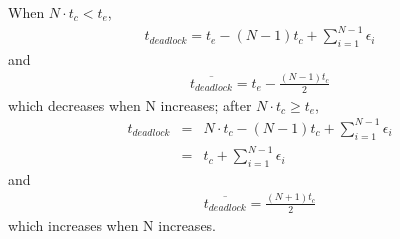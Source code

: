 \documentclass[12pt,letterpaper]{article}
\begin{document}
\begin{itemize}
When $N\cdot t_c<t_e$, 
\begin{align}
t_{deadlock} = t_e - (N-1)t_c + \sum^{N-1}_{i=1}\epsilon_i
\end{align}
and
\begin{align}
\overline{t_{deadlock}}=t_e - \frac{(N-1)t_c}{2}
\end{align}
which decreases when N increases; after $N\cdot t_c\ge t_e$, 
\begin{align}
\nonumber t_{deadlock} & = & N\cdot t_c - (N-1)t_c + \sum^{N-1}_{i=1}\epsilon_i\\
& = & t_c+\sum^{N-1}_{i=1}\epsilon_i
\end{align}
and 
\begin{align}
\overline{t_{deadlock}}=\frac{(N+1)t_c}{2}
\end{align}
which increases when N increases.
\end{itemize}
\end{document}

